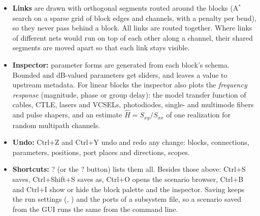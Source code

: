 \begin{itemize}
  source, and sources that feed late blocks are pulled forward. The longest path (the main
  chain) stays on one straight line. Branches such as training sequences, channel estimates
  and meters go in lanes under it, ordered by barycentre sweeps to reduce crossings. A long
  chain wraps into rows sized from the shape of the canvas and run alternately left to right
  and right to left (a horseshoe); the blocks of the reversed rows face left. Scopes and meters
  that tap a link from their bottom side sit above the gap after the block they tap.
  Unconnected blocks go in a last row.
  \item \textbf{Links} are drawn with orthogonal segments routed around the blocks (A$^\ast$
  search on a sparse grid of block edges and channels, with a penalty per bend), so they never
  pass behind a block. All links are routed together. Where links of different nets would run
  on top of each other along a channel, their shared segments are moved apart so that each
  link stays visible.
  \item \textbf{Inspector:} parameter forms are generated from each block's schema. Bounded and
  dB-valued parameters get sliders, and  leaves a value to upstream metadata. For
  linear blocks the inspector also plots the \emph{frequency response} (magnitude, phase or group
  delay): the model transfer function of cables, CTLE, lasers and VCSELs, photodiodes, single-
  and multimode fibers and pulse shapers, and an estimate $\hat H=S_{xy}/S_{xx}$ of one
  realization for random multipath channels.
  \item \textbf{Undo:} Ctrl+Z and Ctrl+Y undo and redo any change: blocks, connections,
  parameters, positions, port places and directions, scopes.
  \item \textbf{Shortcuts:} ? (or the ? button) lists them all. Besides those above: Ctrl+S
  saves, Ctrl+Shift+S saves as, Ctrl+O opens the scenario browser, Ctrl+B and Ctrl+I show or hide
  the block palette and the inspector.
  Saving keeps the run settings (, ) and the ports of a subsystem
  file, so a scenario saved from the GUI runs the same from the command line.
\end{itemize}

